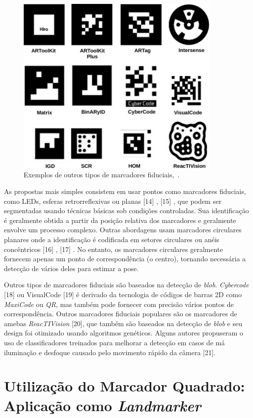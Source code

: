 \begin{figure}[H]
	\centering
	\includegraphics[width=10cm, height=8 cm]{figuras/aruco-tipos.jpg}
	\caption{Exemplos de outros tipos de marcadores fiduciais,~\cite{Garrido2016}.}
	\label{fig:aruco-tipos}
\end{figure}

As propostas mais simples consistem em usar pontos como marcadores fiduciais, como LEDs, esferas retrorreflexivas ou planas [14] , [15] , que podem ser segmentadas usando técnicas básicas sob condições controladas. Sua identificação é geralmente obtida a partir da posição relativa dos marcadores e geralmente envolve um processo complexo. Outras abordagens usam marcadores circulares planares onde a identificação é codificada em setores circulares ou anéis concêntricos [16] , [17] . No entanto, os marcadores circulares geralmente fornecem apenas um ponto de correspondência (o centro), tornando necessária a detecção de vários deles para estimar a pose.

Outros tipos de marcadores fiduciais são baseados na detecção de \textit{blob}. \textit{Cybercode} [18] ou VisualCode [19] é derivado da tecnologia de códigos de barras 2D como \textit{MaxiCode} ou \textit{QR}, mas também pode fornecer com precisão vários pontos de correspondência. Outros marcadores fiduciais populares são os marcadores de amebas \textit{ReacTIVision} [20], que também são baseados na detecção de \textit{blob} e seu design foi otimizado usando algoritmos genéticos. Alguns autores propuseram o uso de classificadores treinados para melhorar a detecção em casos de má iluminação e desfoque causado pelo movimento rápido da câmera [21].

\section{Utilização do Marcador Quadrado: Aplicação como \textit{Landmarker}}

